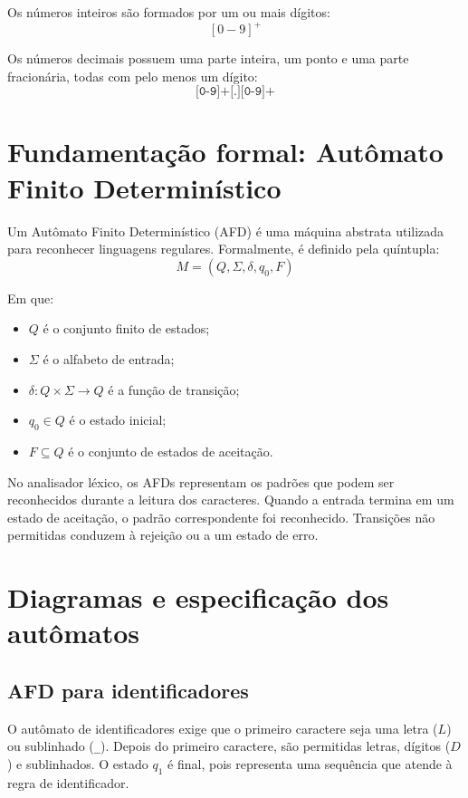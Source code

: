 \documentclass[12pt,a4paper]{article}
\begin{document}
Os números inteiros são formados por um ou mais dígitos:
\[
    [0-9]^+
\]

Os números decimais possuem uma parte inteira, um ponto e uma parte fracionária,
todas com pelo menos um dígito:
\[
    \texttt{[0-9]+[.][0-9]+}
\]

\section{Fundamentação formal: Autômato Finito Determinístico}

Um Autômato Finito Determinístico (AFD) é uma máquina abstrata utilizada para
reconhecer linguagens regulares. Formalmente, é definido pela quíntupla:
\begin{equation}
    M = (Q,\Sigma,\delta,q_0,F)
    \label{eq:afd}
\end{equation}

Em que:
\begin{itemize}
    \item $Q$ é o conjunto finito de estados;
    \item $\Sigma$ é o alfabeto de entrada;
    \item $\delta: Q \times \Sigma \rightarrow Q$ é a função de transição;
    \item $q_0 \in Q$ é o estado inicial;
    \item $F \subseteq Q$ é o conjunto de estados de aceitação.
\end{itemize}

No analisador léxico, os AFDs representam os padrões que podem ser
reconhecidos durante a leitura dos caracteres. Quando a entrada termina em
um estado de aceitação, o padrão correspondente foi reconhecido. Transições
não permitidas conduzem à rejeição ou a um estado de erro.

\section{Diagramas e especificação dos autômatos}

\subsection{AFD para identificadores}

O autômato de identificadores exige que o primeiro caractere seja uma letra
($L$) ou sublinhado (\texttt{\_}). Depois do primeiro caractere, são
permitidas letras, dígitos ($D$) e sublinhados. O estado $q_1$ é final,
pois representa uma sequência que atende à regra de identificador.
\end{document}
